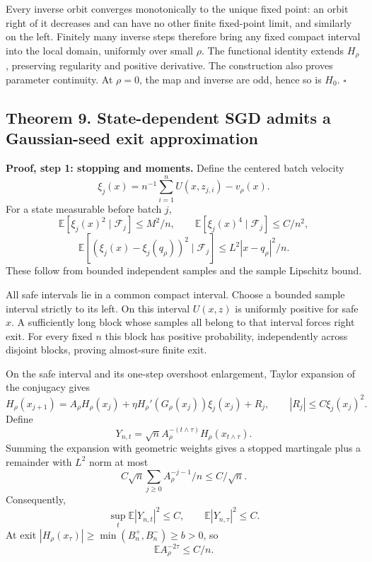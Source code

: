 Every inverse orbit converges monotonically to the unique fixed point:
an orbit right of it decreases and can have no other finite fixed-point
limit, and similarly on the left. Finitely many inverse steps therefore
bring any fixed compact interval into the local domain, uniformly over
small \(\rho\). The functional identity extends \(H_\rho\), preserving
regularity and positive derivative. The construction also proves
parameter continuity. At \(\rho=0\), the map and inverse are odd, hence
so is \(H_0\). \(\square\)

\subsection{Theorem 9. State-dependent SGD admits a Gaussian-seed exit
approximation}\label{gaussian_proofs-theorem-9.-state-dependent-sgd-admits-a-gaussian-seed-exit-approximation}

\textbf{Proof, step 1: stopping and moments.} Define the centered batch
velocity \[
\xi_j(x)=n^{-1}\sum_{i=1}^nU(x,z_{j,i})-v_\rho(x).
\] For a state measurable before batch \(j\), \[
\mathbb E[\xi_j(x)^2\mid\mathcal F_j]\le M^2/n,\qquad
\mathbb E[\xi_j(x)^4\mid\mathcal F_j]\le C/n^2,
\] \[
\mathbb E[(\xi_j(x)-\xi_j(q_\rho))^2\mid\mathcal F_j]
\le L^2|x-q_\rho|^2/n.
\] These follow from bounded independent samples and the sample
Lipschitz bound.

All safe intervals lie in a common compact interval. Choose a bounded
sample interval strictly to its left. On this interval \(U(x,z)\) is
uniformly positive for safe \(x\). A sufficiently long block whose
samples all belong to that interval forces right exit. For every fixed
\(n\) this block has positive probability, independently across disjoint
blocks, proving almost-sure finite exit.

On the safe interval and its one-step overshoot enlargement, Taylor
expansion of the conjugacy gives \[
H_\rho(x_{j+1})=
A_\rho H_\rho(x_j)+
\eta H_\rho'(G_\rho(x_j))\xi_j(x_j)+R_j,
\qquad |R_j|\le C\xi_j(x_j)^2.
\] Define \[
Y_{n,t}=\sqrt n A_\rho^{-(t\wedge\tau)}
H_\rho(x_{t\wedge\tau}).
\] Summing the expansion with geometric weights gives a stopped
martingale plus a remainder with \(L^2\) norm at most \[
C\sqrt n\sum_{j\ge0}A_\rho^{-j-1}/n\le C/\sqrt n.
\] Consequently, \[
\sup_t\mathbb E|Y_{n,t}|^2\le C,\qquad
\mathbb E|Y_{n,\tau}|^2\le C.
\] At exit \(|H_\rho(x_\tau)|\ge\min(B_n^+,B_n^-)\ge b>0\), so \[
\mathbb E A_\rho^{-2\tau}\le C/n.
\]

